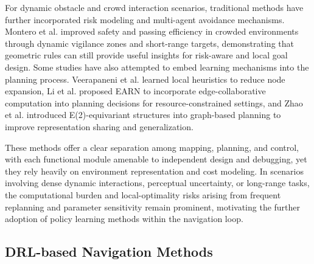 For dynamic obstacle and crowd interaction scenarios, traditional methods have further incorporated risk modeling and multi-agent avoidance mechanisms. Montero et al. \cite{23} improved safety and passing efficiency in crowded environments through dynamic vigilance zones and short-range targets, demonstrating that geometric rules can still provide useful insights for risk-aware and local goal design. Some studies have also attempted to embed learning mechanisms into the planning process. Veerapaneni et al. \cite{24} learned local heuristics to reduce node expansion, Li et al. \cite{25} proposed EARN to incorporate edge-collaborative computation into planning decisions for resource-constrained settings, and Zhao et al. \cite{26} introduced E(2)-equivariant structures into graph-based planning to improve representation sharing and generalization.

These methods offer a clear separation among mapping, planning, and control, with each functional module amenable to independent design and debugging, yet they rely heavily on environment representation and cost modeling. In scenarios involving dense dynamic interactions, perceptual uncertainty, or long-range tasks, the computational burden and local-optimality risks arising from frequent replanning and parameter sensitivity remain prominent, motivating the further adoption of policy learning methods within the navigation loop.

\subsection{DRL-based Navigation Methods}
\label{subsec:drl_navigation}

